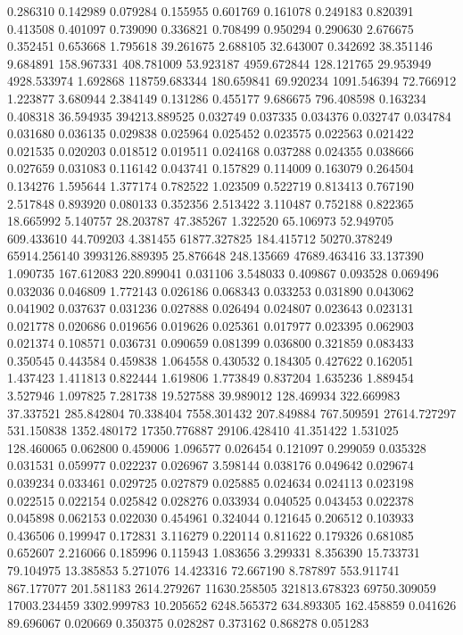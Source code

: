0.286310
0.142989
0.079284
0.155955
0.601769
0.161078
0.249183
0.820391
0.413508
0.401097
0.739090
0.336821
0.708499
0.950294
0.290630
2.676675
0.352451
0.653668
1.795618
39.261675
2.688105
32.643007
0.342692
38.351146
9.684891
158.967331
408.781009
53.923187
4959.672844
128.121765
29.953949
4928.533974
1.692868
118759.683344
180.659841
69.920234
1091.546394
72.766912
1.223877
3.680944
2.384149
0.131286
0.455177
9.686675
796.408598
0.163234
0.408318
36.594935
394213.889525
0.032749
0.037335
0.034376
0.032747
0.034784
0.031680
0.036135
0.029838
0.025964
0.025452
0.023575
0.022563
0.021422
0.021535
0.020203
0.018512
0.019511
0.024168
0.037288
0.024355
0.038666
0.027659
0.031083
0.116142
0.043741
0.157829
0.114009
0.163079
0.264504
0.134276
1.595644
1.377174
0.782522
1.023509
0.522719
0.813413
0.767190
2.517848
0.893920
0.080133
0.352356
2.513422
3.110487
0.752188
0.822365
18.665992
5.140757
28.203787
47.385267
1.322520
65.106973
52.949705
609.433610
44.709203
4.381455
61877.327825
184.415712
50270.378249
65914.256140
3993126.889395
25.876648
248.135669
47689.463416
33.137390
1.090735
167.612083
220.899041
0.031106
3.548033
0.409867
0.093528
0.069496
0.032036
0.046809
1.772143
0.026186
0.068343
0.033253
0.031890
0.043062
0.041902
0.037637
0.031236
0.027888
0.026494
0.024807
0.023643
0.023131
0.021778
0.020686
0.019656
0.019626
0.025361
0.017977
0.023395
0.062903
0.021374
0.108571
0.036731
0.090659
0.081399
0.036800
0.321859
0.083433
0.350545
0.443584
0.459838
1.064558
0.430532
0.184305
0.427622
0.162051
1.437423
1.411813
0.822444
1.619806
1.773849
0.837204
1.635236
1.889454
3.527946
1.097825
7.281738
19.527588
39.989012
128.469934
322.669983
37.337521
285.842804
70.338404
7558.301432
207.849884
767.509591
27614.727297
531.150838
1352.480172
17350.776887
29106.428410
41.351422
1.531025
128.460065
0.062800
0.459006
1.096577
0.026454
0.121097
0.299059
0.035328
0.031531
0.059977
0.022237
0.026967
3.598144
0.038176
0.049642
0.029674
0.039234
0.033461
0.029725
0.027879
0.025885
0.024634
0.024113
0.023198
0.022515
0.022154
0.025842
0.028276
0.033934
0.040525
0.043453
0.022378
0.045898
0.062153
0.022030
0.454961
0.324044
0.121645
0.206512
0.103933
0.436506
0.199947
0.172831
3.116279
0.220114
0.811622
0.179326
0.681085
0.652607
2.216066
0.185996
0.115943
1.083656
3.299331
8.356390
15.733731
79.104975
13.385853
5.271076
14.423316
72.667190
8.787897
553.911741
867.177077
201.581183
2614.279267
11630.258505
321813.678323
69750.309059
17003.234459
3302.999783
10.205652
6248.565372
634.893305
162.458859
0.041626
89.696067
0.020669
0.350375
0.028287
0.373162
0.868278
0.051283

